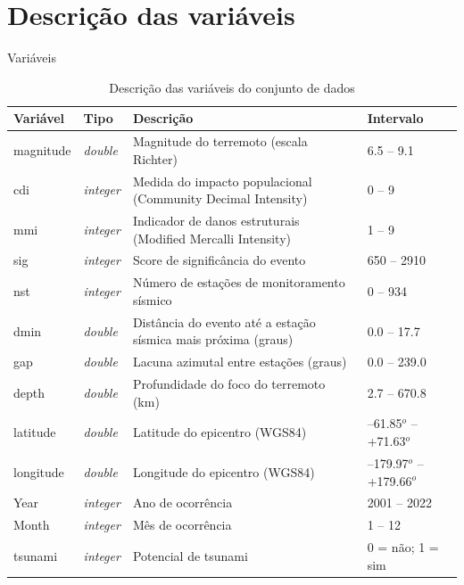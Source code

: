 \documentclass[aspectratio= 169, xcolor=dvipsnames]{beamer}
\begin{document}
\section{Descrição das variáveis}
\begin{frame}{Variáveis}
    \scriptsize
    \begin{table}[h!]
    \centering
    \caption{Descrição das variáveis do conjunto de dados}
    \begin{tabular}{llll}
    \hline
    \textbf{Variável} & \textbf{Tipo} & \textbf{Descrição} & \textbf{Intervalo} \\
    \hline
    
    magnitude & \textit{double} & Magnitude do terremoto (escala Richter) & 6.5 -- 9.1 \\
    
    cdi & \textit{integer} & Medida do impacto populacional (Community Decimal Intensity) & 0 -- 9 \\
    
    mmi & \textit{integer} & Indicador de danos estruturais (Modified Mercalli Intensity) & 1 -- 9 \\
    
    sig & \textit{integer} & Score de significância do evento & 650 -- 2910 \\
    
    nst & \textit{integer} & Número de estações de monitoramento sísmico & 0 -- 934 \\
    
    dmin & \textit{double} & Distância do evento até a estação sísmica mais próxima (graus) & 0.0 -- 17.7 \\
    
    gap & \textit{double} & Lacuna azimutal entre estações (graus) & 0.0 -- 239.0 \\
    
    depth & \textit{double} & Profundidade do foco do terremoto (km) & 2.7 -- 670.8 \\
    
    latitude & \textit{double} & Latitude do epicentro (WGS84) & --61.85\(^o\) -- +71.63\(^o\) \\
    
    longitude & \textit{double} & Longitude do epicentro (WGS84) & --179.97\(^o\) -- +179.66\(^o\) \\
    
    Year & \textit{integer} & Ano de ocorrência & 2001 -- 2022 \\
    
    Month & \textit{integer} & Mês de ocorrência & 1 -- 12 \\
    
    tsunami & \textit{integer} & Potencial de tsunami & 0 = não; 1 = sim \\
    \hline
    \end{tabular}
    \end{table}
\end{frame}
\end{document}
